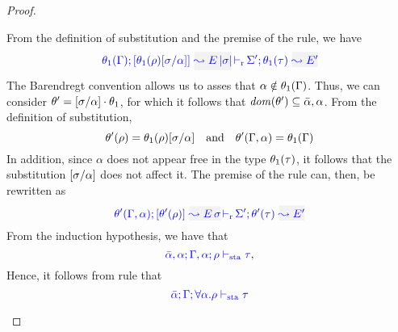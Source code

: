 \begin{proof}
\begin{description}
From the definition of substitution and the premise of the rule, we have
\begin{equation*}
  \dmres{\theta_1(\tenv)}{\theta_1(\rulet)[\suty/\alpha]}{\mmapp{E}{\etrans{\suty}}}{\theta_1(\type)}{E'}{\Sigma'}
\end{equation*}
The Barendregt convention allows us to asses that $\alpha\notin\theta_1(\Gamma)$. Thus, we can
consider $\theta'=[\sigma/\alpha]\cdot\theta_1$, for which it follows that
${\it dom }{(\theta')}\subseteq\bar\alpha,\alpha$. From the definition of substitution,
\begin{equation*}
  \theta'(\rho) = \theta_1(\rho)[\sigma/\alpha]\quad\text{and}\quad
  \theta'(\Gamma,\alpha) = \theta_1(\Gamma)
\end{equation*}
In addition, since $\alpha$ does not appear free in the type $\theta_1(\tau)$,
it follows that the substitution $[\sigma/\alpha]$ does not affect it.
The premise of the rule can, then, be rewritten as
\begin{equation*}
  \dmres{\theta'(\tenv,\alpha)}{\theta'(\rulet)}{\mmapp{E}{\suty}}{\theta'(\type)}{E'}{\Sigma'}
\end{equation*}
From the induction hypothesis, we have that
\begin{equation*}
  {\color{blue} \bar\alpha,\alpha; \Gamma,\alpha; \rho\vdash_{\mathrm{sta}}\tau}
,\end{equation*}
Hence, it follows from rule  that
\begin{equation*}
  {\color{blue} \bar\alpha; \Gamma; \forall \alpha.\rho\vdash_{\mathrm{sta}}\tau}
\end{equation*}


\end{description}
\end{proof}

